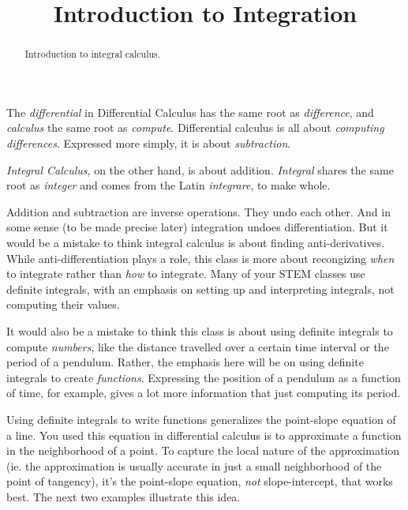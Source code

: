 \documentclass{ximera}
\title{Introduction to Integration}
\begin{document}
\begin{abstract}
Introduction to integral calculus.
\end{abstract}
\maketitle

The \emph{differential} in Differential Calculus has the same root as \emph{difference}, and \emph{calculus} the same root as \emph{compute}. Differential calculus is all about \emph{computing differences}. Expressed more simply, it is about \emph{subtraction}.

\emph{Integral Calculus}, on the other hand, is about addition. \emph{Integral} shares the same root as \emph{integer} and comes from the Latin \emph{integrare}, to make whole. 

Addition and subtraction are inverse operations. They undo each other. And in some sense (to be made precise later) integration
undoes differentiation. But it would be a mistake to think integral calculus is about finding anti-derivatives. While anti-differentiation plays a role, this class is more about recongizing \emph{when} to integrate rather than \emph{how} to integrate. Many of your STEM classes use definite integrals, with an emphasis on setting up and interpreting integrals, not computing their values. 

It would also be a mistake to think this class is about using definite integrals to compute \emph{numbers}, like the distance travelled over a certain time interval or the period of a pendulum. Rather, the emphasis here will be on using definite integrals to create \emph{functions}. Expressing the position of a pendulum as a function of time, for example, gives a lot more information that just computing its period. 

Using definite integrals to write functions generalizes the point-slope equation of a line. You used this equation in differential calculus is to approximate a function in the neighborhood of a point. To capture the local nature of the approximation (ie. the approximation is usually accurate in just a small neighborhood of the point of tangency), it's the point-slope equation, \emph{not} slope-intercept, that works best. The next two examples illustrate this idea.   %
\end{document}
